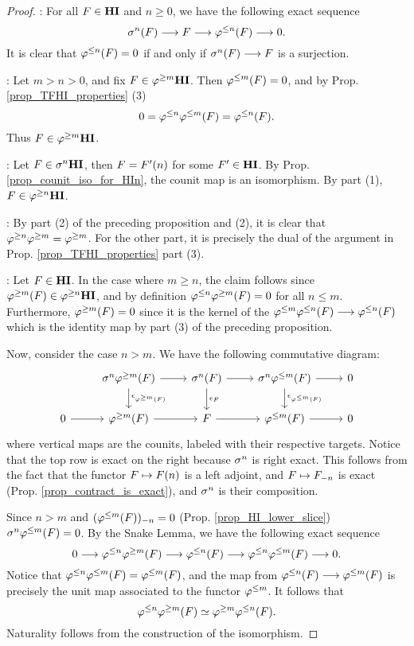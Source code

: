 \begin{proof}
 : For all $F \in \HI$ and $n \geq 0$, we have the 
following exact sequence
\[
\sgHI{n}(F) \to F \to \tlHI{n}(F) \to 0.
\]
It is clear that $\tlHI{n}(F) = 0$ if and only if $\sgHI{n}(F) 
\to F$ is a surjection.

 : Let $m > n > 0$, and fix $F \in \THI{m}$. Then 
$\tlHI{m}(F) = 0$, and by Prop. \ref{prop_TFHI_properties} (3)
\[
0 = \tlHI{n}\tlHI{m}(F) = \tlHI{n}(F).
\]
Thus $F \in \THI{m}$.

 : Let $F \in \sgHI{n} \HI$, then $F = \LHI[n]{F'}$ 
for some $F' \in \HI$. By Prop. \ref{prop_counit_iso_for_HIn},
the counit map is an isomorphism. By part (1), $F \in \THI{n}$.

 : By part (2) of the preceding proposition and (2), 
it is clear that $\tgHI{n} \tgHI{m} = \tgHI{m}$. For the other
part, it is precisely the dual of the argument in Prop. 
\ref{prop_TFHI_properties} part (3).

 : Let $F \in \HI$. In the case where $m \geq n$,
the claim follows since $\tgHI{m}(F) \in \THI{n}$, and by 
definition $\tlHI{n} \tgHI{m}(F) = 0$ for all $n \leq m$. 
Furthermore, $\tgHI{m}(F) = 0$ since it is the kernel of the 
$\tlHI{m} \tlHI{n}(F) \to \tlHI{n}(F)$ which is the identity map
by part (3) of the preceding proposition.

Now, consider the case $n > m$. We have the following 
commutative diagram:
\[
\begin{tikzcd}
{} &
\sgHI{n} \tgHI{m}(F) \arrow{r} \arrow{d}{\cuHI_{\tgHI{m}(F)}} &
\sgHI{n}(F) \arrow{r} \arrow{d}{\cuHI_{F}} &
\sgHI{n} \tlHI{m}(F) \arrow{r} \arrow{d}{\cuHI_{\tlHI{m}(F)}} &
0 \\
0 \arrow{r} &
\tgHI{m}(F) \arrow{r} &
F \arrow{r} &
\tlHI{m}(F) \arrow{r}&
0
\end{tikzcd}
\]
where vertical maps are the counits, labeled with their respective
targets. Notice that the top row is exact on the right because 
$\sgHI{n}$ is right exact. This follows from the fact that the 
functor $F \mapsto \LHI[n]{F}$ is a left adjoint, and $F \mapsto 
\RHI[n]{F}$ is exact (Prop. \ref{prop_contract_is_exact}), and 
$\sgHI{n}$ is their composition.

Since $n > m$ and $\RHI[n]{(\tlHI{m}(F))} = 0$ (Prop. 
\ref{prop_HI_lower_slice}) $\sgHI{n}\tlHI{m}(F) = 0$. By the Snake
Lemma, we have the following exact sequence
\[
0 \to \tlHI{n}\tgHI{m}(F) \to \tlHI{n}(F) \to \tlHI{n} \tlHI{m}(F) 
   \to 0.
\]
Notice that $\tlHI{n} \tlHI{m}(F) = \tlHI{m}(F)$, and the map from
$\tlHI{n}(F) \to \tlHI{m}(F)$ is precisely the unit map associated
to the functor $\tlHI{m}$. It follows that
\[
\tlHI{n} \tgHI{m}(F) \simeq \tgHI{m} \tlHI{n}(F).
\]
Naturality follows from the construction of the isomorphism.
\end{proof}

